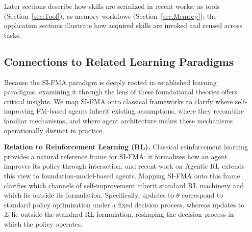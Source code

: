 \documentclass{article}
\begin{document}
Later sections describe how skills are serialized in recent works: as tools (Section~\ref{sec:Tool}), as memory workflows (Section~\ref{sec:Memory}); the application sections illustrate how acquired skills are invoked and reused across tasks.


\subsection{Connections to Related Learning Paradigms}
\label{subsec:Connections_to_Related_Learning_Paradigms}



Because the SI-FMA paradigm is deeply rooted in established learning paradigms, examining it through the lens of these foundational theories offers critical insights. We map SI-FMA onto classical frameworks to clarify where self-improving FM-based agents inherit existing assumptions, where they recombine familiar mechanisms, and where agent architecture makes these mechanisms operationally distinct in practice.

\textbf{Relation to Reinforcement Learning (RL).} 
Classical reinforcement learning provides a natural reference frame for SI-FMA: it formalizes how an agent improves its policy through interaction, and recent work on Agentic RL \citep{zhang2025landscape} extends this view to foundation-model-based agents. Mapping SI-FMA onto this frame clarifies which channels of self-improvement inherit standard RL machinery and which lie outside its formulation. Specifically, updates to $\theta$ correspond to standard policy optimization under a fixed decision process, whereas updates to $\Sigma$ lie outside the standard RL formulation, reshaping the decision process in which the policy operates.
\end{document}
